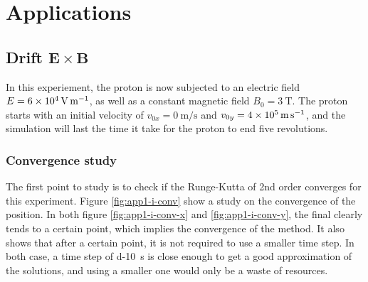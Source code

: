 \documentclass[a4paper,12pt,twoside]{article}
\begin{document}
\section{Applications}
\subsection{Drift $\mathbf{E}\times \mathbf{B}$}
In this experiement, the proton is now subjected to an electric field $E=\SI{6d4}{\volt\per\meter}$, as well as a constant magnetic field $B_0 = \SI{3}{\tesla}$.
The proton starts with an initial velocity of $v_{0x}=\SI{0}{\meter\per\second}$ and $v_{0y}=\SI{4d5}{\meter\per\second}$, and the simulation will last the time it take for the proton to end five revolutions.

\subsubsection{Convergence study}
The first point to study is to check if the Runge-Kutta of 2nd order converges for this experiment.
Figure \ref{fig:app1-i-conv} show a study on the convergence of the position.
In both figure \ref{fig:app1-i-conv-x} and \ref{fig:app1-i-conv-y}, the final clearly tends to a certain point, which implies the convergence of the method.
It also shows that after a certain point, it is not required to use a smaller time step.
In both case, a time step of \SI{d-10}{\second} is close enough to get a good approximation of the solutions, and using a smaller one would only be a waste of resources.
\end{document}
